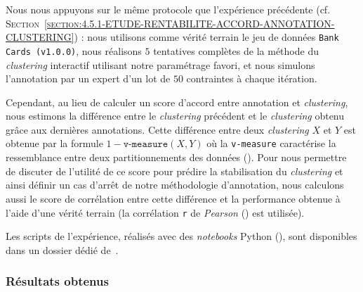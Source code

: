 			Nous nous appuyons sur le même protocole que l'expérience précédente (cf. \textsc{Section~\ref{section:4.5.1-ETUDE-RENTABILITE-ACCORD-ANNOTATION-CLUSTERING}}) : nous utilisons comme vérité terrain le jeu de données \texttt{Bank Cards (v1.0.0)}, nous réalisons $5$ tentatives complètes de la méthode du \textit{clustering} interactif utilisant notre paramétrage favori, et nous simulons l'annotation par un expert d'un lot de $50$ contraintes à chaque itération.
			
			Cependant, au lieu de calculer un score d'accord entre annotation et \textit{clustering}, nous estimons la différence entre le \textit{clustering} précédent et le \textit{clustering} obtenu grâce aux dernières annotations.
			Cette différence entre deux \textit{clustering} $X$ et $Y$ est obtenue par la formule $1-\texttt{v-measure}(X,Y)$ où la \texttt{v-measure} caractérise la ressemblance entre deux partitionnements des données (\cite{rosenberg-hirschberg:2007:vmeasure-conditional-entropybased}).
			Pour nous permettre de discuter de l'utilité de ce score pour prédire la stabilisation du \textit{clustering} et ainsi définir un cas d'arrêt de notre méthodologie d'annotation, nous calculons aussi le score de corrélation entre cette différence et la performance obtenue à l'aide d'une vérité terrain (la corrélation \texttt{r} de \textit{Pearson} (\cite{kirch:2008:pearson-correlation-coefficient}) est utilisée).
			
			\begin{leftBarInformation}
				Les scripts de l'expérience, réalisés avec des \textit{notebooks} Python (\cite{van-rossum-drake:2009:python-reference-manual}), sont disponibles dans un dossier dédié de~\cite{schild:2021:cognitivefactory-interactiveclusteringcomparativestudy}.
			\end{leftBarInformation}

		\subsubsection{Résultats obtenus}
			

